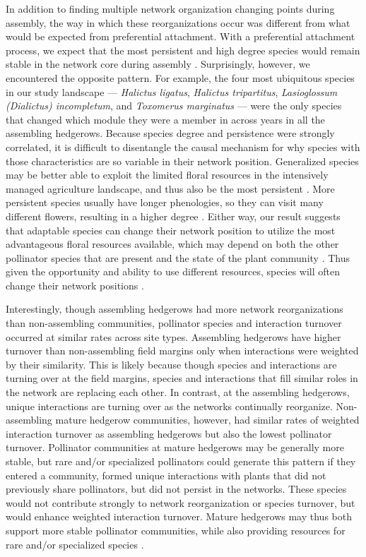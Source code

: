 \documentclass[12pt]{article}
\begin{document}
In addition to finding multiple network organization changing points
during assembly, the way in which these reorganizations occur was
different from what would be expected from preferential
attachment. With a preferential attachment process, we expect that the
most persistent and high degree species would remain stable in the
network core during assembly
\citep{barabasi1999emergence}. Surprisingly, however, we encountered
the opposite pattern. For example, the four most ubiquitous species in
our study landscape --- \textit{Halictus ligatus}, \textit{Halictus
  tripartitus}, \textit{Lasioglossum (Dialictus) incompletum}, and
\textit{Toxomerus marginatus} --- were the only species that changed
which module they were a member in across years in all the assembling
hedgerows. Because species degree and persistence were strongly
correlated, it is difficult to disentangle the causal mechanism for
why species with those characteristics are so variable in their
network position. Generalized species may be better able to exploit
the limited floral resources in the intensively managed agriculture
landscape, and thus also be the most persistent \citep[in ant-plant
mutualisms, ][]{diaz2010changes}. More persistent species usually have
longer phenologies, so they can visit many different flowers,
resulting in a higher degree \citep{Vazquez2009,
  fort2016abundance}. Either way, our result suggests that adaptable
species can change their network position to utilize the most
advantageous floral resources available, which may depend on both the
other pollinator species that are present and the state of the plant
community \citep{macleod2016measuring, gomez2006ecological,
  Waser1996}. Thus given the opportunity and ability to
use different resources, species will often change their network
positions \citep{macleod2016measuring}.

Interestingly, though assembling hedgerows had more network
reorganizations than non-assembling communities, pollinator species
and interaction turnover occurred at similar rates across site types.
Assembling hedgerows have higher turnover than non-assembling field
margins only when interactions were weighted by their similarity. This
is likely because though species and interactions are turning over at
the field margins, species and interactions that fill similar roles in
the network are replacing each other. In contrast, at the assembling
hedgerows, unique interactions are turning over as the networks
continually reorganize. Non-assembling mature hedgerow communities,
however, had similar rates of weighted interaction turnover as
assembling hedgerows but also the lowest pollinator
turnover. Pollinator communities at mature hedgerows may be generally
more stable, but rare and/or specialized pollinators could generate
this pattern if they entered a community, formed unique interactions
with plants that did not previously share pollinators, but did not
persist in the networks. These species would not contribute strongly
to network reorganization or species turnover, but would enhance
weighted interaction turnover. Mature hedgerows may thus both support
more stable pollinator communities, while also providing resources for
rare and/or specialized species \citep{kremen-2015-602,
  mgonigle-2015-x}.
\end{document}
